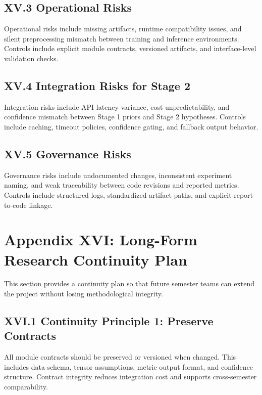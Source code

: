 \subsection*{XV.3 Operational Risks}
Operational risks include missing artifacts, runtime compatibility issues, and silent preprocessing mismatch between training and inference environments. Controls include explicit module contracts, versioned artifacts, and interface-level validation checks.

\subsection*{XV.4 Integration Risks for Stage 2}
Integration risks include API latency variance, cost unpredictability, and confidence mismatch between Stage 1 priors and Stage 2 hypotheses. Controls include caching, timeout policies, confidence gating, and fallback output behavior.

\subsection*{XV.5 Governance Risks}
Governance risks include undocumented changes, inconsistent experiment naming, and weak traceability between code revisions and reported metrics. Controls include structured logs, standardized artifact paths, and explicit report-to-code linkage.

\section*{Appendix XVI: Long-Form Research Continuity Plan}

This section provides a continuity plan so that future semester teams can extend the project without losing methodological integrity.

\subsection*{XVI.1 Continuity Principle 1: Preserve Contracts}
All module contracts should be preserved or versioned when changed. This includes data schema, tensor assumptions, metric output format, and confidence structure. Contract integrity reduces integration cost and supports cross-semester comparability.

